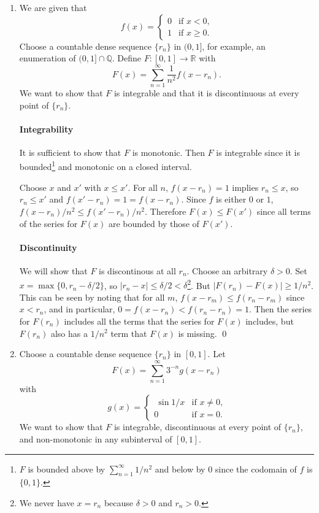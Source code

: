 \documentclass[oneside]{article}
\newcommand\abs[1]{\left|#1\right|}
\newcommand\bbR{\mathbb{R}}
\newcommand\bbQ{\mathbb{Q}}
\begin{document}
  \begin{enumerate}[label=(\alph*)]
    \item
      We are given that \[
        f(x) = \begin{cases}
          0 &\text{if }x < 0\text{,} \\
          1 &\text{if }x \geq 0 \text{.}
        \end{cases}
      \] Choose a countable dense sequence $\{r_n\}$ in $(0,1]$, for example, an enumeration of $(0,1] \cap \bbQ$. Define $F: [0,1] \to \bbR$ with \[
        F(x) = \sum_{n=1}^\infty \frac1{n^2}f(x-r_n) \text{.}
      \] We want to show that $F$ is integrable and that it is discontinuous at every point of $\{r_n\}$.

      \paragraph{Integrability} It is sufficient to show that $F$ is monotonic. Then $F$ is integrable since it is bounded\footnote{$F$ is bounded above by $\sum_{n=1}^\infty 1/n^2$ and below by $0$ since the codomain of $f$ is $\{0,1\}$.} and monotonic on a closed interval.

      Choose $x$ and $x'$ with $x \leq x'$. For all $n$, $f(x - r_n) = 1$ implies $r_n \leq x$, so $r_n \leq x'$ and $f(x' - r_n) = 1 = f(x - r_n)$. Since $f$ is either $0$ or $1$, $f(x - r_n)/n^2 \leq f(x' - r_n)/n^2$. Therefore $F(x) \leq F(x')$ since all terms of the series for $F(x)$ are bounded by those of $F(x')$.

      \paragraph{Discontinuity} We will show that $F$ is discontinous at all $r_n$. Choose an arbitrary $\delta > 0$. Set $x = \max\{0, r_n - \delta/2\}$, so $\abs{r_n - x} \leq \delta/2 < \delta$\footnote{We never have $x = r_n$ because $\delta > 0$ and $r_n > 0$.}. But $\abs{F(r_n) - F(x)} \geq 1/n^2$. This can be seen by noting that for all $m$, $f(x - r_m) \leq f(r_n - r_m)$ since $x < r_n$, and in particular, $0 = f(x - r_n) < f(r_n - r_n) = 1$. Then the series for $F(r_n)$ includes all the terms that the series for $F(x)$ includes, but $F(r_n)$ also has a $1/n^2$ term that $F(x)$ is missing. \qed

    \item Choose a countable dense sequence $\{r_n\}$ in $[0,1]$. Let\[
        F(x) = \sum_{n=1}^\infty 3^{-n}g(x-r_n)
      \] with \[
        g(x) = \begin{cases}\
          \sin 1/x & \text{if }x \neq 0\text{,} \\
          0 & \text{if }x = 0\text{.}
        \end{cases}
      \] We want to show that $F$ is integrable, discontinuous at every point of $\{r_n\}$, and non-monotonic in any subinterval of $[0,1]$.


\end{enumerate}
\end{document}
